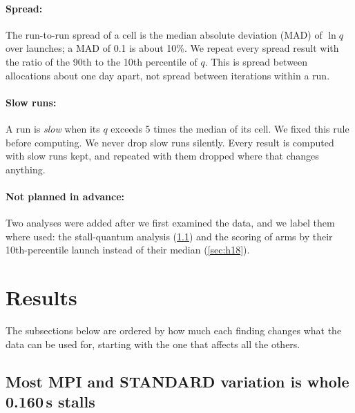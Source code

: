 \documentclass[11pt]{article}
\begin{document}
\paragraph{Spread:} The run-to-run spread of a cell is the median absolute deviation (MAD)
of $\ln q$ over launches; a MAD of 0.1 is about 10\%. We repeat every spread result with
the ratio of the 90th to the 10th percentile of $q$. This is spread between allocations
about one day apart, not spread between iterations within a run.

\paragraph{Slow runs:} A run is \emph{slow} when its $q$ exceeds 5 times the median of its
cell. We fixed this rule before computing. We never drop slow runs silently. Every result
is computed with slow runs kept, and repeated with them dropped where that changes
anything.

\paragraph{Not planned in advance:} Two analyses were added after we first examined the
data, and we label them where used: the stall-quantum analysis (\cref{sec:stalls}) and the scoring of
arms by their 10th-percentile launch instead of their median (\cref{sec:h18}).

\section{Results}
\label{sec:results}

The subsections below are ordered by how much each finding changes what the data can be
used for, starting with the one that affects all the others.

\FloatBarrier
\subsection{Most MPI and STANDARD variation is whole \texorpdfstring{0.160\,s}{0.160 s} stalls}
\label{sec:stalls}
\end{document}
